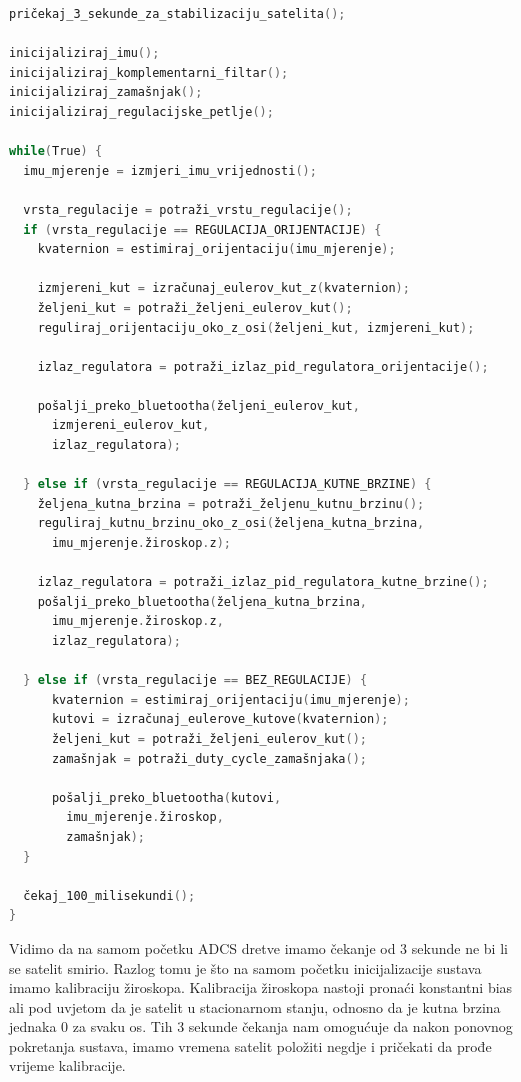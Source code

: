 \documentclass[times, utf8, diplomski, numeric]{templates/template}
\begin{document}
{{{{                \begin{lstlisting}[language=C]
pričekaj_3_sekunde_za_stabilizaciju_satelita();

inicijaliziraj_imu();
inicijaliziraj_komplementarni_filtar();
inicijaliziraj_zamašnjak();
inicijaliziraj_regulacijske_petlje();

while(True) {
  imu_mjerenje = izmjeri_imu_vrijednosti();

  vrsta_regulacije = potraži_vrstu_regulacije();
  if (vrsta_regulacije == REGULACIJA_ORIJENTACIJE) {
    kvaternion = estimiraj_orijentaciju(imu_mjerenje);

    izmjereni_kut = izračunaj_eulerov_kut_z(kvaternion);
    željeni_kut = potraži_željeni_eulerov_kut();
    reguliraj_orijentaciju_oko_z_osi(željeni_kut, izmjereni_kut);

    izlaz_regulatora = potraži_izlaz_pid_regulatora_orijentacije();

    pošalji_preko_bluetootha(željeni_eulerov_kut, 
      izmjereni_eulerov_kut, 
      izlaz_regulatora);

  } else if (vrsta_regulacije == REGULACIJA_KUTNE_BRZINE) {
    željena_kutna_brzina = potraži_željenu_kutnu_brzinu();
    reguliraj_kutnu_brzinu_oko_z_osi(željena_kutna_brzina, 
      imu_mjerenje.žiroskop.z);

    izlaz_regulatora = potraži_izlaz_pid_regulatora_kutne_brzine();
    pošalji_preko_bluetootha(željena_kutna_brzina, 
      imu_mjerenje.žiroskop.z, 
      izlaz_regulatora);

  } else if (vrsta_regulacije == BEZ_REGULACIJE) {
      kvaternion = estimiraj_orijentaciju(imu_mjerenje);
      kutovi = izračunaj_eulerove_kutove(kvaternion);
      željeni_kut = potraži_željeni_eulerov_kut();
      zamašnjak = potraži_duty_cycle_zamašnjaka();

      pošalji_preko_bluetootha(kutovi, 
        imu_mjerenje.žiroskop, 
        zamašnjak);
  }

  čekaj_100_milisekundi();
}               \end{lstlisting}

                Vidimo da na samom početku ADCS dretve imamo čekanje od 3 sekunde ne bi li se satelit smirio. Razlog tomu je što na samom početku inicijalizacije sustava imamo kalibraciju žiroskopa. Kalibracija žiroskopa nastoji pronaći konstantni bias ali pod uvjetom da je satelit u stacionarnom stanju, odnosno da je kutna brzina jednaka 0 za svaku os. Tih 3 sekunde čekanja nam omogućuje da nakon ponovnog pokretanja sustava, imamo vremena satelit položiti negdje i pričekati da prođe vrijeme kalibracije.

}}}}
\end{document}
